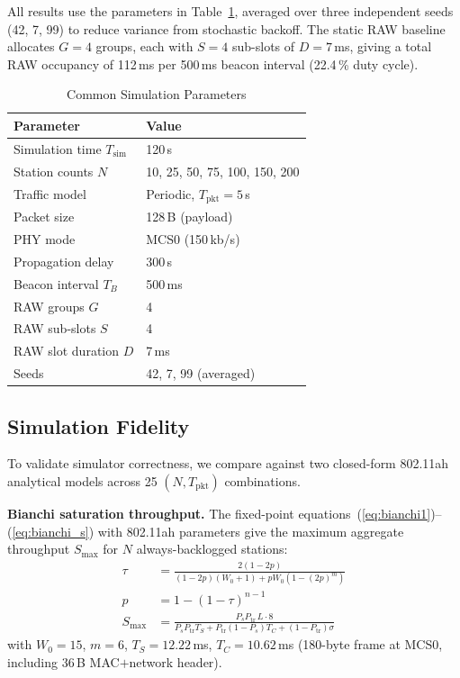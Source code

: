 \documentclass[conference]{IEEEtran}
\begin{document}
All results use the parameters in Table~\ref{tab:setup}, averaged over three
independent seeds (42, 7, 99) to reduce variance from stochastic backoff.
The static RAW baseline allocates $G{=}4$ groups, each with $S{=}4$
sub-slots of $D{=}7$\,ms, giving a total RAW occupancy of 112\,ms per
500\,ms beacon interval (22.4\,\% duty cycle).

\begin{table}[!t]
\renewcommand{\arraystretch}{1.15}
\caption{Common Simulation Parameters}
\label{tab:setup}
\centering
\begin{tabular}{@{}ll@{}}
\toprule
\textbf{Parameter} & \textbf{Value} \\
\midrule
Simulation time $T_\mathrm{sim}$  & 120\,s \\
Station counts $N$                 & 10, 25, 50, 75, 100, 150, 200 \\
Traffic model                      & Periodic, $T_\mathrm{pkt}{=}5$\,s \\
Packet size                        & 128\,B (payload) \\
PHY mode                           & MCS0 (150\,kb/s) \\
Propagation delay                  & 300\,\textmu{}s \\
Beacon interval $T_B$              & 500\,ms \\
RAW groups $G$                     & 4 \\
RAW sub-slots $S$                  & 4 \\
RAW slot duration $D$              & 7\,ms \\
Seeds                              & 42, 7, 99 (averaged) \\
\bottomrule
\end{tabular}
\end{table}

\subsection{Simulation Fidelity}

To validate simulator correctness, we compare against two closed-form
802.11ah analytical models across 25 $(N, T_\mathrm{pkt})$ combinations.

\textbf{Bianchi saturation throughput.}
The fixed-point equations~(\ref{eq:bianchi1})--(\ref{eq:bianchi_s}) with
802.11ah parameters give the maximum aggregate throughput $S_\mathrm{max}$
for $N$ always-backlogged stations:
\begin{align}
  \tau &= \frac{2(1-2p)}{(1-2p)(W_0+1)+pW_0(1-(2p)^m)}
  \label{eq:bianchi1} \\
  p    &= 1-(1-\tau)^{n-1}
  \label{eq:bianchi2} \\
  S_\mathrm{max} &= \frac{P_s P_\mathrm{tr}\,L\cdot 8}
    {P_s P_\mathrm{tr} T_S + P_\mathrm{tr}(1{-}P_s)T_C
     + (1{-}P_\mathrm{tr})\sigma}
  \label{eq:bianchi_s}
\end{align}
with $W_0{=}15$, $m{=}6$, $T_S{=}12.22$\,ms, $T_C{=}10.62$\,ms (180-byte
frame at MCS0, including 36\,B MAC$+$network header).
\end{document}
